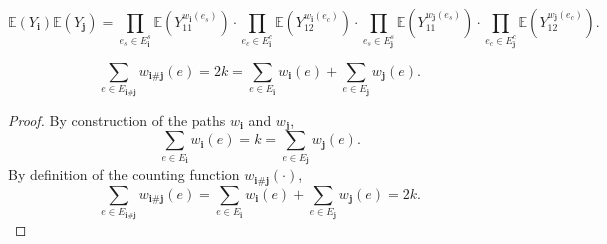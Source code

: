   \[
  \mathbb{E}(Y_\mathbf{i}) \mathbb{E}(Y_\mathbf{j}) 
  = \prod_{e_s \in E^s_{\mathbf{i}}} \mathbb{E} (Y_{11}^{w_{\mathbf{i}}(e_s)}) \cdot \prod_{e_c \in E^c_{\mathbf{i}}} \mathbb{E} (Y_{12}^{w_{\mathbf{i}}(e_c)})
  \cdot \prod_{e_s \in E^s_{\mathbf{j}}} \mathbb{E} (Y_{11}^{w_{\mathbf{j}}(e_s)}) \cdot \prod_{e_c \in E^c_{\mathbf{j}}} \mathbb{E} (Y_{12}^{w_{\mathbf{j}}(e_c)}).
  \]
\begin{lemma}
  \notready
  \label{lem:sum_count_edge_pair_eq_length_add_length} 
  \[
  \sum_{e \in E_{\mathbf{i} \# \mathbf{j}}} w_{\mathbf{i} \# \mathbf{j}}(e) 
  = 2k 
  = \sum_{e \in E_\mathbf{i}} w_{\mathbf{i}}(e) + \sum_{e \in E_\mathbf{j}} w_{\mathbf{j}}(e).
  \]
\end{lemma}
\begin{proof}
  By construction of the paths $w_\mathbf{i}$ and $w_\mathbf{j}$,
  \[
  \sum_{e \in E_\mathbf{i}} w_{\mathbf{i}}(e) = k = \sum_{e \in E_\mathbf{j}} w_{\mathbf{j}}(e).
  \]
  By definition of the counting function $w_{\mathbf{i} \# \mathbf{j}}(\cdot)$,
  \[
  \sum_{e \in E_{\mathbf{i} \# \mathbf{j}}} w_{\mathbf{i} \# \mathbf{j}}(e)  
  = \sum_{e \in E_\mathbf{i}} w_{\mathbf{i}}(e) + \sum_{e \in E_\mathbf{j}} w_{\mathbf{j}}(e)
  = 2k.
  \]
\end{proof}
